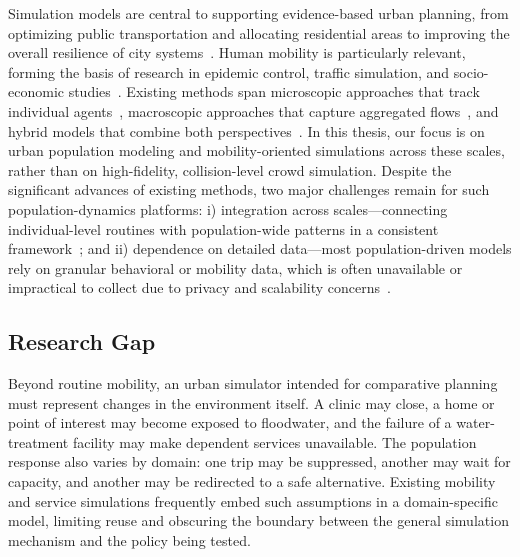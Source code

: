 \documentclass[pdflatex,sn-mathphys-num]{sn-jnl}%
\newcommand\redb[1]{#1}
\theoremstyle{thmstyleone}%
\theoremstyle{thmstyletwo}%
\theoremstyle{thmstylethree}%
\begin{document}
Simulation models are central to supporting evidence-based urban planning, from optimizing public transportation and allocating residential areas to improving the overall resilience of city systems~\citep{eid1980, tekouabou2022MLinUrbanPlanning}. Human mobility is particularly relevant, forming the basis of research in epidemic control, traffic simulation, and socio-economic studies~\citep{haraguchi2022mobilityDataReview, serana2023multilevelmodeling}. Existing methods span microscopic approaches that track individual agents~\citep{helbing1995social, cao2021competitiveCooperative, khan2024heterogeneousSurvey, ruprecht2024adaptiveMovement}, macroscopic approaches that capture aggregated flows~\citep{hughes2002continuum, treuille2006continuum,thalmann2007crowd}, and hybrid models that combine both perspectives~\citep{xiong2010hybrid, ijaz2015hybridSurvey, antonitsch2019bioclouds, dang2023multilevelCrowd}. 
\redb{In this thesis, our focus is on urban population modeling and mobility-oriented simulations across these scales, rather than on high-fidelity, collision-level crowd simulation.} Despite the significant advances of existing methods, two major challenges remain for such population-dynamics platforms: i) integration across scales—connecting individual-level routines with population-wide patterns in a consistent framework~\citep{cogo2019integrability, alessandretti2020nature}; and ii) dependence on detailed data—most population-driven models rely on granular behavioral or mobility data, which is often unavailable or impractical to collect due to privacy and scalability concerns~\citep{cogo2019integrability, alessandretti2020nature}.

\subsection{Research Gap}

Beyond routine mobility, an urban simulator intended for comparative planning must represent changes in the environment itself. A clinic may close, a home or point of interest may become exposed to floodwater, and the failure of a water-treatment facility may make dependent services unavailable. The population response also varies by domain: one trip may be suppressed, another may wait for capacity, and another may be redirected to a safe alternative. Existing mobility and service simulations frequently embed such assumptions in a domain-specific model, limiting reuse and obscuring the boundary between the general simulation mechanism and the policy being tested.
\end{document}

